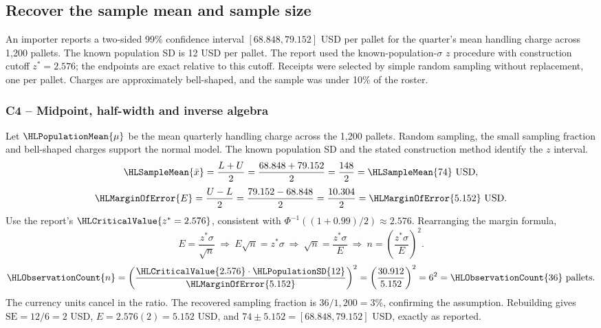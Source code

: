 \subsection{Recover the sample mean and sample size}\label{prob:c4-2}
An importer reports a two-sided 99\% confidence interval $[68.848,79.152]$ USD per pallet for the quarter's mean handling charge across 1,200 pallets. The known population SD is 12 USD per pallet. The report used the known-population-$\sigma$ $z$ procedure with construction cutoff $z^*=2.576$; the endpoints are exact relative to this cutoff. Receipts were selected by simple random sampling without replacement, one per pallet. Charges are approximately bell-shaped, and the sample was under 10\% of the roster.
\subsubsection*{C4 -- Midpoint, half-width and inverse algebra}\label{sol:c4-2-a}
Let $\HLPopulationMean{\mu}$ be the mean quarterly handling charge across the 1,200 pallets. Random sampling, the small sampling fraction and bell-shaped charges support the normal model. The known population SD and the stated construction method identify the $z$ interval.
\[
\HLSampleMean{\bar x}=\frac{L+U}{2}=\frac{68.848+79.152}{2}
=\frac{148}{2}=\HLSampleMean{74}\text{ USD},
\]
\[
\HLMarginOfError{E}=\frac{U-L}{2}=\frac{79.152-68.848}{2}
=\frac{10.304}{2}=\HLMarginOfError{5.152}\text{ USD}.
\]
Use the report's $\HLCriticalValue{z^*=2.576}$, consistent with $\Phi^{-1}((1+0.99)/2)\approx2.576$. Rearranging the margin formula,
\[
E=\frac{z^*\sigma}{\sqrt n}
\ \Longrightarrow\ E\sqrt n=z^*\sigma
\ \Longrightarrow\ \sqrt n=\frac{z^*\sigma}{E}
\ \Longrightarrow\ n=\left(\frac{z^*\sigma}{E}\right)^2.
\]
\[
\HLObservationCount{n}=\left(\frac{\HLCriticalValue{2.576}\cdot\HLPopulationSD{12}}{\HLMarginOfError{5.152}}\right)^2
=\left(\frac{30.912}{5.152}\right)^2=6^2=\HLObservationCount{36}\text{ pallets}.
\]
The currency units cancel in the ratio. The recovered sampling fraction is $36/1{,}200=3\%$, confirming the assumption. Rebuilding gives $\mathrm{SE}=12/6=2$ USD, $E=2.576(2)=5.152$ USD, and $74\pm5.152=[68.848,79.152]$ USD, exactly as reported.

